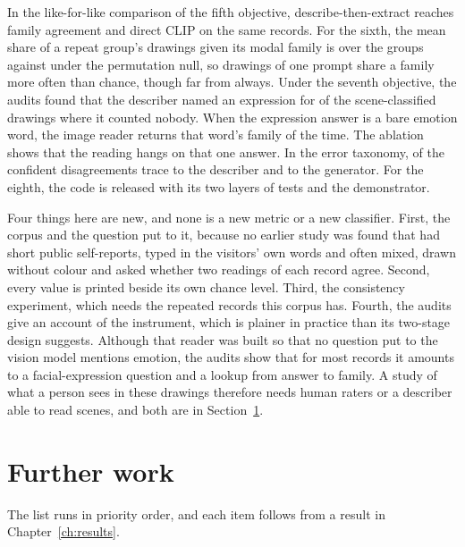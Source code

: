 In the like-for-like comparison of the fifth objective, describe-then-extract reaches \McDeFam{} family agreement and direct CLIP \McClipFam{} on the same \McN{} records. For the sixth, the mean share of a repeat group's drawings given its modal family is \ConsFam{} over the \nGroups{} groups against \ConsFamNull{} under the permutation null, so drawings of one prompt share a family more often than chance, though far from always. Under the seventh objective, the audits found that the describer named an expression for \DescScenePeopleZeroExpr{} of the \DescScenePeopleZero{} scene-classified drawings where it counted nobody. When the expression answer is a bare emotion word, the image reader returns that word's family \DescCopyStrict{} of the time. The ablation shows that the reading hangs on that one answer. In the error taxonomy, \TaxDescriber{} of the \TaxN{} confident disagreements trace to the describer and \TaxGenerator{} to the generator. For the eighth, the code is released with its two layers of tests and the demonstrator.

Four things here are new, and none is a new metric or a new classifier. First, the corpus and the question put to it, because no earlier study was found that had short public self-reports, typed in the visitors' own words and often mixed, drawn without colour and asked whether two readings of each record agree. Second, every value is printed beside its own chance level. Third, the consistency experiment, which needs the \nRepeats{} repeated records this corpus has. Fourth, the audits give an account of the instrument, which is plainer in practice than its two-stage design suggests. Although that reader was built so that no question put to the vision model mentions emotion, the audits show that for most records it amounts to a facial-expression question and a lookup from answer to family. A study of what a person sees in these drawings therefore needs human raters or a describer able to read scenes, and both are in Section~\ref{sec:further}.

\section{Further work}
\label{sec:further}

The list runs in priority order, and each item follows from a result in Chapter~\ref{ch:results}.

